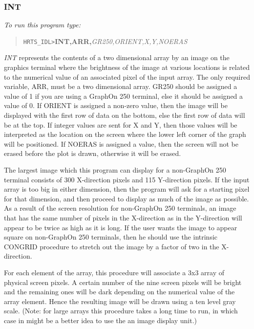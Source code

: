 \subsubsection{INT}

{\em To run this program type:}
\begin{quote}
     {\tt HRTS\_IDL>}{\bf INT,ARR,}{\it GR250,ORIENT,X,Y,NOERAS}
\end{quote}

{\em INT} represents the contents of a two dimensional array by an image on the
graphics terminal where the brightness of the image at various locations is
related to the numerical value of an associated pixel of the input array.  The
only required variable, ARR, must be a two dimensional array.  GR250 should be
assigned a value of 1 if you are using a GraphOn 250 terminal, else it should
be assigned a value of 0. If ORIENT is assigned a non-zero value, then the
image will be displayed with the first row of data on the bottom, else the
first row of data will be at the top.  If integer values are sent for X and Y,
then those values will be interpreted as the location on the screen where the
lower left corner of the graph will be positioned.  If NOERAS is assigned a
value, then the screen will not be erased before the plot is drawn, otherwise
it will be erased.

The largest image which this program can display for a non-GraphOn 250 terminal
consists of 300 X-direction pixels and 115 Y-direction pixels.  If the input
array is too big in either dimension, then the program will ask for a starting
pixel for that dimension, and then proceed to display as much of the image as
possible.  As a result of the screen resolution for non-GraphOn 250 terminals,
an image that has the same number of pixels in the X-direction as in the
Y-direction will appear to be twice as high as it is long.  If the user wants
the image to appear square on non-GraphOn 250 terminals, then he should use the
intrinsic CONGRID procedure to stretch out the image by a factor of two in the
X-direction.

For each element of the array, this procedure will associate a 3x3 array of
physical screen pixels.  A certain number of the nine screen pixels will be
bright and the remaining ones will be dark depending on the numerical value of
the array element.  Hence the resulting image will be drawn using a ten level
gray scale.  (Note:  for large arrays this procedure takes a long time to run,
in which case in might be a better idea to use the an image  display unit.)

